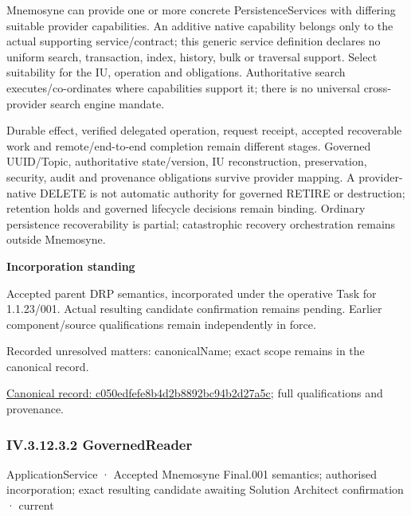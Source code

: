 Mnemosyne can provide one or more concrete PersistenceServices with differing suitable provider capabilities. An additive native capability belongs only to the actual supporting service/contract; this generic service definition declares no uniform search, transaction, index, history, bulk or traversal support. Select suitability for the IU, operation and obligations. Authoritative search executes/co-ordinates where capabilities support it; there is no universal cross-provider search engine mandate.



Durable effect, verified delegated operation, request receipt, accepted recoverable work and remote/end-to-end completion remain different stages. Governed UUID/Topic, authoritative state/version, IU reconstruction, preservation, security, audit and provenance obligations survive provider mapping. A provider-native DELETE is not automatic authority for governed RETIRE or destruction; retention holds and governed lifecycle decisions remain binding. Ordinary persistence recoverability is partial; catastrophic recovery orchestration remains outside Mnemosyne.



\par\medskip\textbf{Incorporation standing}\par


Accepted parent DRP semantics, incorporated under the operative Task for 1.1.23/001. Actual resulting candidate confirmation remains pending. Earlier component/source qualifications remain independently in force.


{\small Recorded unresolved matters: canonicalName; exact scope remains in the canonical record.}\par
{\footnotesize \href{../../../../continuum/application/application-service/c050edfefe8b4d2b8892bc94b2d27a5c.md}{Canonical record: c050edfefe8b4d2b8892bc94b2d27a5c}; full qualifications and provenance.}\par
\subsubsection*{IV.3.12.3.2 GovernedReader}
\label{navigation:IV.3.12.3.2}

\label{element:410a938f42964474b7cf5655815dc830}
{\small ApplicationService · Accepted Mnemosyne Final.001 semantics; authorised incorporation; exact resulting candidate awaiting Solution Architect confirmation · current}\par

